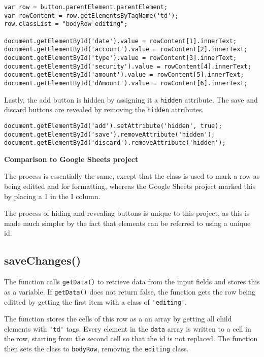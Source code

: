\documentclass[letterpaper]{article}
\begin{document}
\begin{lstlisting}[firstnumber=181]
var row = button.parentElement.parentElement;
var rowContent = row.getElementsByTagName('td');
row.classList = "bodyRow editing";

document.getElementById('date').value = rowContent[1].innerText;
document.getElementById('account').value = rowContent[2].innerText;
document.getElementById('type').value = rowContent[3].innerText;
document.getElementById('security').value = rowContent[4].innerText;
document.getElementById('amount').value = rowContent[5].innerText;
document.getElementById('dAmount').value = rowContent[6].innerText;
\end{lstlisting}

Lastly, the add button is hidden by assigning it a \lstinline{hidden} attribute.
The save and discard buttons are revealed by removing the \lstinline{hidden} attributes.

\begin{lstlisting}[firstnumber=192]
document.getElementById('add').setAttribute('hidden', true);
document.getElementById('save').removeAttribute('hidden');
document.getElementById('discard').removeAttribute('hidden');
\end{lstlisting}

\textbf{Comparison to Google Sheets project}

The process is essentially the same, except that the class is used to mark a row as being editted and for formatting, whereas the Google Sheets project marked this by placing a 1 in the I column.

The process of hiding and revealing buttons is unique to this project, as this is made much simpler by the fact that elements can be referred to using a unique id.

\subsection{saveChanges()}

The function calls \lstinline{getData()} to retrieve data from the input fields and stores this as a variable.
If \lstinline{getData()} does not return false, the function gets the row being editted by getting the first item with a class of \lstinline{'editing'}.

The function stores the cells of this row as a an array by getting all child elements with \lstinline{'td'} tags.
Every element in the \lstinline{data} array is written to a cell in the row, starting from the second cell so that the id is not replaced.
The function then sets the class to \lstinline{bodyRow}, removing the \lstinline{editing} class.
\end{document}
